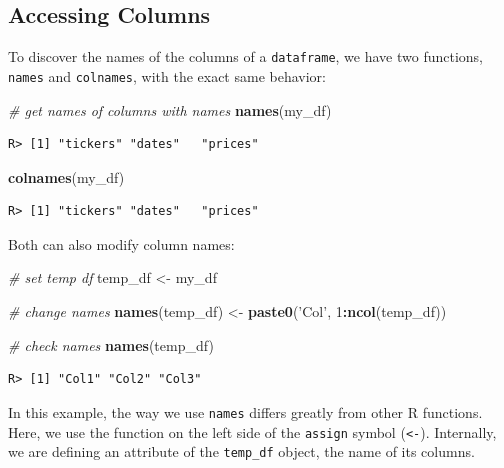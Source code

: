 \documentclass[
  12pt,
]{book}
\newenvironment{Shaded}{\begin{snugshade}}{\end{snugshade}}
\newcommand{\CommentTok}[1]{\textcolor[rgb]{0.37,0.37,0.37}{\textit{#1}}}
\newcommand{\DecValTok}[1]{\textcolor[rgb]{0.06,0.06,0.06}{#1}}
\newcommand{\KeywordTok}[1]{\textcolor[rgb]{0.27,0.27,0.27}{\textbf{#1}}}
\newcommand{\NormalTok}[1]{#1}
\newcommand{\OperatorTok}[1]{\textcolor[rgb]{0.43,0.43,0.43}{\textbf{#1}}}
\newcommand{\StringTok}[1]{\textcolor[rgb]{0.5,0.5,0.5}{#1}}
\begin{document}
\hypertarget{accessing-columns}{%
\subsection{Accessing Columns}\label{accessing-columns}}

To discover the names of the columns of a \texttt{dataframe}, we have two functions, \texttt{names} and \texttt{colnames}, with the exact same behavior:  

\begin{Shaded}
\begin{Highlighting}[]
\CommentTok{# get names of columns with names}
\KeywordTok{names}\NormalTok{(my_df)}
\end{Highlighting}
\end{Shaded}

\begin{verbatim}
R> [1] "tickers" "dates"   "prices"
\end{verbatim}

\begin{Shaded}
\begin{Highlighting}[]
\KeywordTok{colnames}\NormalTok{(my_df)}
\end{Highlighting}
\end{Shaded}

\begin{verbatim}
R> [1] "tickers" "dates"   "prices"
\end{verbatim}

Both can also modify column names:

\begin{Shaded}
\begin{Highlighting}[]
\CommentTok{# set temp df}
\NormalTok{temp_df <-}\StringTok{ }\NormalTok{my_df}

\CommentTok{# change names}
\KeywordTok{names}\NormalTok{(temp_df) <-}\StringTok{ }\KeywordTok{paste0}\NormalTok{(}\StringTok{'Col'}\NormalTok{, }\DecValTok{1}\OperatorTok{:}\KeywordTok{ncol}\NormalTok{(temp_df))}

\CommentTok{# check names}
\KeywordTok{names}\NormalTok{(temp_df)}
\end{Highlighting}
\end{Shaded}

\begin{verbatim}
R> [1] "Col1" "Col2" "Col3"
\end{verbatim}

In this example, the way we use \texttt{names} differs greatly from other R functions. Here, we use the function on the left side of the \texttt{assign} symbol (\texttt{\textless{}-}). Internally, we are defining an attribute of the \texttt{temp\_df} object, the name of its columns.
\end{document}
